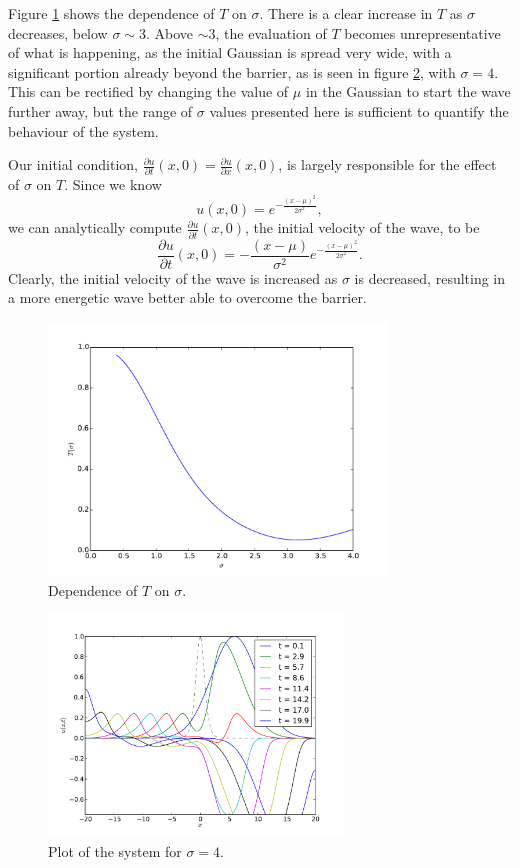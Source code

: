 \documentclass[10pt]{article}
\begin{document}
Figure \ref{f:sigma} shows the dependence of $T$ on $\sigma$. There is a clear
increase in $T$ as $\sigma$ decreases, below $\sigma \sim 3$. Above $\sim 3$,
the evaluation of $T$ becomes unrepresentative of what is happening, as
the initial Gaussian is spread very wide, with a significant portion already beyond
the barrier, as is seen in figure \ref{f:bigsig}, with $\sigma = 4$.
This can be rectified by changing the value of $\mu$ in the Gaussian to start the
wave further away, but the range of $\sigma$ values presented here is sufficient
to quantify the behaviour of the system.

Our initial condition, $\frac{\partial u}{\partial t}(x,0) = \frac{\partial u}{\partial x} (x,0)$,
is largely responsible for the effect of $\sigma$ on $T$. Since we know
$$ u(x,0) = e^{-\frac{(x-\mu)^2}{2\sigma^2}},$$
we can analytically compute $\frac{\partial u}{\partial t}(x,0)$, the initial velocity
of the wave, to be
$$ \frac{\partial u}{\partial t}(x,0) = -\frac{(x-\mu)}{\sigma^2}e^{-\frac{(x-\mu)^2}{2\sigma^2}}. $$
Clearly, the initial velocity of the wave is increased as $\sigma$ is decreased, resulting in
a more energetic wave better able to overcome the barrier.

\begin{figure}
  \centering
  \includegraphics[width=0.8\textwidth]{2/sigma.pdf}
  \caption{Dependence of $T$ on $\sigma$.}
  \label{f:sigma}
\end{figure}

\begin{figure}
  \centering
  \includegraphics[width=0.7\textwidth]{2/bigsig.pdf}
  \caption{Plot of the system for $\sigma=4$.}
  \label{f:bigsig}
\end{figure}
\end{document}
